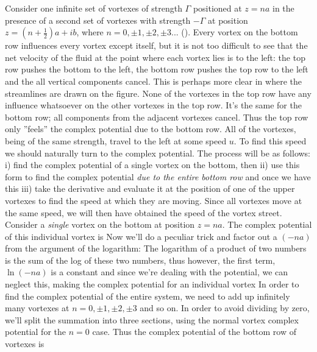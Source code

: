 \documentclass[12pt]{book}
\begin{document}
Consider one infinite set of vortexes of strength $\Gamma$ positioned at $z=na$ in the presence of a second set of vortexes with strength $-\Gamma$ at position $z = (n+\frac{1}{2})a + ib$, where \mbox{$n = 0, \pm1, \pm2, \pm3 ...$} ().  Every vortex on the bottom row influences every vortex except itself, but it is not too difficult to see that the net velocity of the fluid at the point where each vortex lies is to the left:  the top row pushes the bottom to the left, the bottom row pushes the top row to the left and the all vertical components cancel.  This is perhaps more clear in  where the streamlines are drawn on the figure.  None of the vortexes in the top row have any influence whatsoever on the other vortexes in the top row.  It's the same for the bottom row; all components from the adjacent vortexes cancel.  Thus the top row only ''feels'' the complex potential due to the bottom row.  All of the vortexes, being of the same strength, travel to the left at some speed $u$. To find this speed we should naturally turn to the complex potential. The process will be as follows:  i) find the complex potential of a single vortex on the bottom, then ii) use this form to find the complex potential \textit{due to the entire bottom row} and once we have this iii) take the derivative and evaluate it at the position of one of the upper vortexes to find the speed at which they are moving.  Since all vortexes move at the same speed, we will then have obtained the speed of the vortex street. Consider a \textit{single} vortex on the bottom at position $z=na$.  The complex potential of this individual vortex is 
Now we'll do a peculiar trick and factor out a $(-na)$ from the argument of the logarithm:
The logarithm of a product of two numbers is the sum of the log of these two numbers, thus
however, the first term, $\ln(-na)$ is a constant and since we're dealing with the potential, we can neglect this, making the complex potential for an individual vortex
In order to find the complex potential of the entire system, we need to add up infinitely many vortexes at \mbox{$n = 0, \pm1, \pm2, \pm3$} and so on.  In order to avoid dividing by zero, we'll split the summation into three sections, using the normal vortex complex potential for the $n=0$ case. Thus the complex potential of the bottom row of vortexes is
\end{document}

